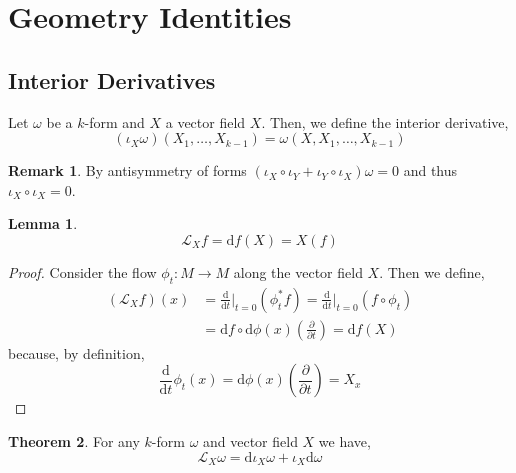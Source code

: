 \documentclass[12pt]{extarticle}
\renewcommand{\d}[1]{ \mathrm{d}#1 \:}
\newcommand{\deriv}[2]{\frac{\d{#1}}{\d{#2}}}
\newcommand{\pderiv}[2]{\frac{\partial{#1}}{\partial{#2}}}
\theoremstyle{definition}
\newtheorem{theorem}{Theorem}[section]
\newtheorem{lemma}[theorem]{Lemma}
\newtheorem{remark}{Remark}
\newenvironment{definition}[1][Definition:]{\begin{trivlist}
\item[\hskip \labelsep {\bfseries #1}]}{\end{trivlist}}
\begin{document}
\section{Geometry Identities}
\renewcommand{\L}{\mathcal{L}}
\newcommand{\Har}{\mathcal{H}}
\renewcommand{\d}{\mathrm{d}}
\newcommand{\Inner}[2]{\left< \left< #1, #2 \right> \right>}
\newcommand{\struct}[1]{\mathcal{O}_{#1}}


\subsection{Interior Derivatives}

\begin{definition}
Let $\omega$ be a $k$-form and $X$ a vector field $X$. Then, we define the interior derivative,
\[ (\iota_X \omega)(X_1, \dots, X_{k-1}) = \omega(X, X_1, \dots, X_{k-1}) \] 
\end{definition}

\begin{remark}
By antisymmetry of forms $(\iota_X \circ \iota_Y + \iota_Y \circ \iota_X) \omega = 0$ and thus $\iota_X \circ \iota_X = 0$. 
\end{remark}

\begin{lemma}
\[ \L_X f = \d{f}(X) = X(f) \]
\end{lemma}

\begin{proof}
Consider the flow $\phi_t : M \to M$ along the vector field $X$. Then we define,
\begin{align*}
(\L_X f)(x) & = \deriv{}{t} \bigg|_{t = 0} (\phi_t^* f) = \deriv{}{t} \bigg|_{t = 0} (f \circ \phi_t)
\\
& = \d{f} \circ \d{\phi(x)} \left( \pderiv{}{t} \right) = \d{f} (X) 
\end{align*}
because, by definition,
\[ \deriv{}{t} \phi_t(x) = \d{\phi(x)} \left( \pderiv{}{t} \right) = X_x \]
\end{proof}

\begin{theorem}
For any $k$-form $\omega$ and vector field $X$ we have,
\[ \L_X \omega = \d{\iota_X \omega}  + \iota_X \d{\omega} \]
\end{theorem}
\end{document}
